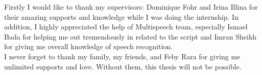 \begin{acknowledgements}
Firstly I would like to thank my supervisors: Dominique Fohr and Irina Illina for their amazing supports and knowledge while I was doing the internship. In addition, I highly appreciated the help of Multispeech team, especially Ismael Bada for helping me out tremendously in related to the script and Imran Sheikh for giving me overall knowledge of speech recognition. \\

I never forget to thank my family, my friends, and Feby Rara for giving me unlimited supports and love. Without them, this thesis will not be possible.

\end{acknowledgements}